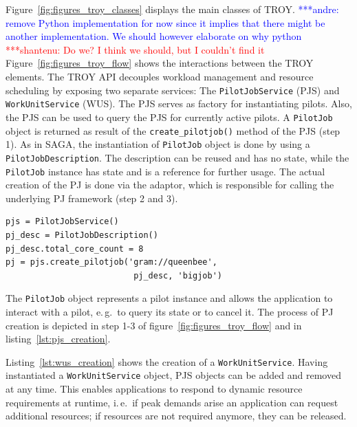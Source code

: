 \documentclass[conference,final]{IEEEtran}
\newcommand{\jhanote}[1]{ {\textcolor{red} { ***shantenu: #1 }}}
\newcommand{\alnote}[1]{ {\textcolor{blue} { ***andre: #1 }}}
\newcommand{\alnote}[1]{}
\newcommand{\jhanote}[1]{}
\begin{document}
Figure~\ref{fig:figures_troy_classes} displays the main classes of TROY.
\alnote{remove Python implementation for now since it implies that there might
be another implementation. We should however elaborate on why python}\jhanote{Do
we? I think we should, but I couldn't find it}
Figure~\ref{fig:figures_troy_flow} shows the interactions between the TROY
elements. The TROY API decouples workload management and resource scheduling by
exposing two separate services: The \texttt{PilotJobService} (PJS) and
\texttt{WorkUnitService} (WUS). The PJS serves as factory for instantiating
pilots. Also, the PJS can be used to query the PJS for currently active pilots.
A \texttt{PilotJob} object is returned as result of the
\texttt{create\_pilotjob()} method of the PJS (step 1). As in SAGA, the
instantiation of \texttt{PilotJob} object is done by using a
\texttt{PilotJobDescription}. The description can be reused and has no state,
while the \texttt{PilotJob} instance has state and is a reference for further
usage. The actual creation of the PJ is done via the adaptor, which is
responsible for calling the underlying PJ framework (step 2 and 3).

\lstset{
language=Python,
frame=single,
captionpos=b,
stringstyle=\ttfamily,
basicstyle=\scriptsize\ttfamily
}

\noindent\begin{minipage}{0.47 \textwidth}
\begin{lstlisting}[caption={\textbf{PilotJob Creation:} Instantiation of a Pilot Job Service using a Pilot Job Description.}, label={lst:pjs_creation}]
pjs = PilotJobService()
pj_desc = PilotJobDescription()
pj_desc.total_core_count = 8
pj = pjs.create_pilotjob('gram://queenbee', 
                          pj_desc, 'bigjob')
\end{lstlisting}
\end{minipage}

The \texttt{PilotJob} object represents a pilot instance and allows the 
application to interact with a pilot, e.\,g.\ to query its state or to cancel 
it. The process of PJ creation is depicted in step 1-3 of 
figure~\ref{fig:figures_troy_flow} and in listing~\ref{lst:pjs_creation}.

Listing~\ref{lst:wus_creation} shows the creation of a \texttt{WorkUnitService}.
Having instantiated a \texttt{WorkUnitService} object, PJS objects can be added
and removed at any time. This enables applications to respond to dynamic
resource requirements at runtime, i.\,e.\ if peak demands arise an application
can request additional resources; if resources are not required anymore, they
can be released.
\end{document}
